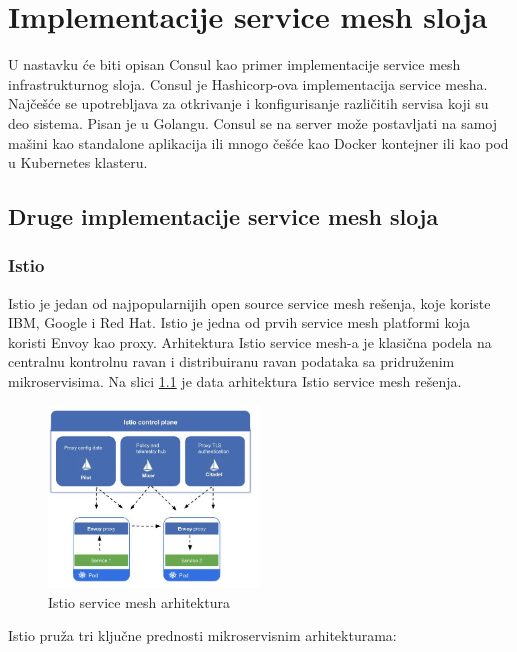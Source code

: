 \documentclass[a4paper,12pt]{report}
\begin{document}
\chapter{Implementacije service mesh sloja}

U nastavku će biti opisan Consul kao primer implementacije service mesh infrastrukturnog sloja. Consul je Hashicorp-ova implementacija service mesha. Najčešće se upotrebljava za otkrivanje i konfigurisanje različitih servisa koji su deo sistema. Pisan je u Golangu. Consul se na server može postavljati na samoj mašini kao standalone aplikacija ili mnogo češće kao Docker kontejner ili kao pod u Kubernetes klasteru. 

\section{Druge implementacije service mesh sloja}

\subsection{Istio}

Istio je jedan od najpopularnijih open source service mesh rešenja, koje koriste IBM, Google i Red Hat. Istio je jedna od prvih service mesh platformi koja koristi Envoy kao proxy. Arhitektura Istio service mesh-a je klasična podela na centralnu kontrolnu ravan i distribuiranu ravan podataka sa pridruženim mikroservisima. Na slici \ref{fig:istio-architecture} je data arhitektura Istio service mesh rešenja. \newline

\begin{figure}[h]
    \centering
    \includegraphics[width=0.5\textwidth]{istio_architecture}
    \caption{Istio service mesh arhitektura}
    \label{fig:istio-architecture}
\end{figure}

Istio pruža tri ključne prednosti mikroservisnim arhitekturama: 
\end{document}

